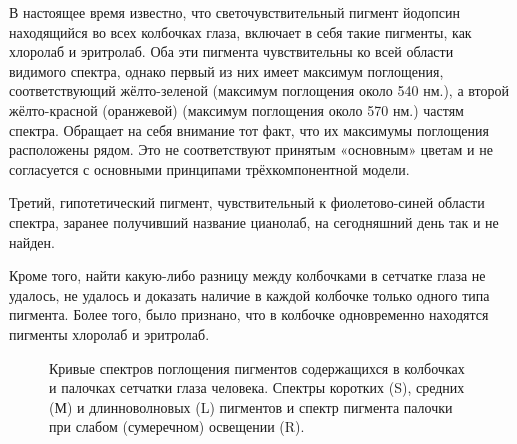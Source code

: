 \documentclass[a4paper,12pt]{article}
\begin{document}
В настоящее время известно, что светочувствительный пигмент йодопсин находящийся во всех колбочках глаза, включает в себя такие пигменты, как хлоролаб и эритролаб. Оба эти пигмента чувствительны ко всей области видимого спектра, однако первый из них имеет максимум поглощения, соответствующий жёлто-зеленой (максимум поглощения около 540 нм.), а второй жёлто-красной (оранжевой) (максимум поглощения около 570 нм.) частям спектра. Обращает на себя внимание тот факт, что их максимумы поглощения расположены рядом. Это не соответствуют принятым «основным» цветам и не согласуется с основными принципами трёхкомпонентной модели.


Третий, гипотетический пигмент, чувствительный к фиолетово-синей области спектра, заранее получивший название цианолаб, на сегодняшний день так и не найден.


Кроме того, найти какую-либо разницу между колбочками в сетчатке глаза не удалось, не удалось и доказать наличие в каждой колбочке только одного типа пигмента. Более того, было признано, что в колбочке одновременно находятся пигменты хлоролаб и эритролаб.
\begin{figure}[h]
\caption{Кривые спектров поглощения пигментов содержащихся в колбочках и палочках сетчатки глаза человека. Спектры коротких (S), средних (М) и длинноволновых (L) пигментов и спектр пигмента палочки при слабом (сумеречном) освещении (R).}
\label{ris:image}
\end{figure}
\end{document}

